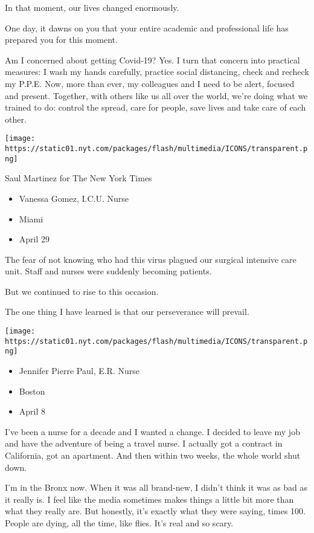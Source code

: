In that moment, our lives changed enormously.

One day, it dawns on you that your entire academic and professional life
has prepared you for this moment.

Am I concerned about getting Covid-19? Yes. I turn that concern into
practical measures: I wash my hands carefully, practice social
distancing, check and recheck my P.P.E. Now, more than ever, my
colleagues and I need to be alert, focused and present. Together, with
others like us all over the world, we're doing what we trained to do:
control the spread, care for people, save lives and take care of each
other.

\texttt{[image: https://static01.nyt.com/packages/flash/multimedia/ICONS/transparent.png]}

Saul Martinez for The New York Times

\begin{itemize}
\tightlist
\item
  Vanessa Gomez, I.C.U. Nurse
\item
  Miami
\item
  April 29
\end{itemize}

The fear of not knowing who had this virus plagued our surgical
intensive care unit. Staff and nurses were suddenly becoming patients.

But we continued to rise to this occasion.

The one thing I have learned is that our perseverance will prevail.

\texttt{[image: https://static01.nyt.com/packages/flash/multimedia/ICONS/transparent.png]}

\begin{itemize}
\tightlist
\item
  Jennifer Pierre Paul, E.R. Nurse
\item
  Boston
\item
  April 8
\end{itemize}

I've been a nurse for a decade and I wanted a change. I decided to leave
my job and have the adventure of being a travel nurse. I actually got a
contract in California, got an apartment. And then within two weeks, the
whole world shut down.

I'm in the Bronx now. When it was all brand-new, I didn't think it was
as bad as it really is. I feel like the media sometimes makes things a
little bit more than what they really are. But honestly, it's exactly
what they were saying, times 100. People are dying, all the time, like
flies. It's real and so scary.

